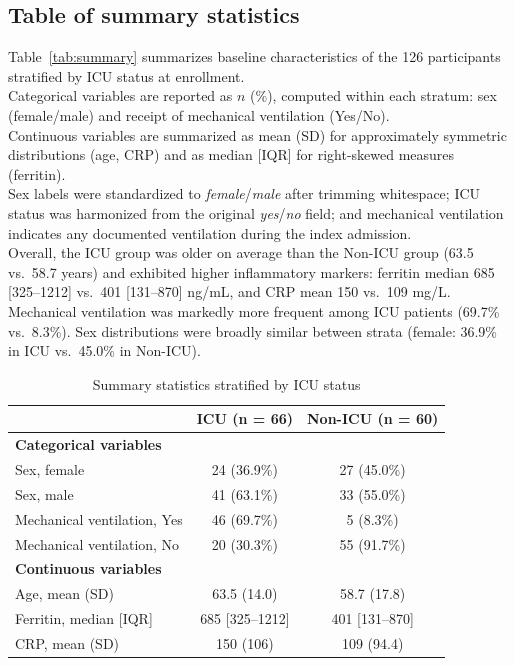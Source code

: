\documentclass[11pt]{article}
\begin{document}
\subsection{Table of summary statistics}
Table~\ref{tab:summary} summarizes baseline characteristics of the 126 participants stratified by ICU status at enrollment. \\
Categorical variables are reported as $n$ (\%), computed within each stratum: sex (female/male) and receipt of mechanical ventilation (Yes/No). \\
Continuous variables are summarized as mean (SD) for approximately symmetric distributions (age, CRP) and as median [IQR] for right-skewed measures (ferritin). \\
Sex labels were standardized to \textit{female}/\textit{male} after trimming whitespace; ICU status was harmonized from the original \textit{yes}/\textit{no} field; and mechanical ventilation indicates any documented ventilation during the index admission. \\
Overall, the ICU group was older on average than the Non-ICU group (63.5 vs.\ 58.7 years) and exhibited higher inflammatory markers: ferritin median 685 [325--1212] vs.\ 401 [131--870] ng/mL, and CRP mean 150 vs.\ 109 mg/L. Mechanical ventilation was markedly more frequent among ICU patients (69.7\% vs.\ 8.3\%). Sex distributions were broadly similar between strata (female: 36.9\% in ICU vs.\ 45.0\% in Non-ICU). 

\label{tab:summary}
\begin{table}[ht]
\centering
\caption{Summary statistics stratified by ICU status}
\begin{tabular}{lcc}
\hline
 & ICU (n = 66) & Non-ICU (n = 60) \\
\hline
\textbf{Categorical variables} & & \\
Sex, female & 24 (36.9\%) & 27 (45.0\%) \\
Sex, male   & 41 (63.1\%) & 33 (55.0\%) \\
Mechanical ventilation, Yes & 46 (69.7\%) & 5 (8.3\%) \\
Mechanical ventilation, No  & 20 (30.3\%) & 55 (91.7\%) \\
\hline
\textbf{Continuous variables} & & \\
Age, mean (SD) & 63.5 (14.0) & 58.7 (17.8) \\
Ferritin, median [IQR] & 685 [325--1212] & 401 [131--870] \\
CRP, mean (SD) & 150 (106) & 109 (94.4) \\
\hline
\end{tabular}
\end{table}
\end{document}
